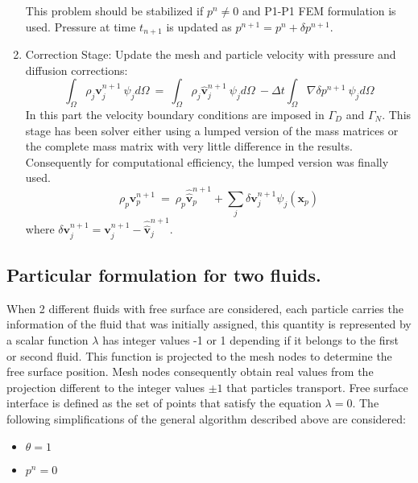 \begin{enumerate}
 This problem should be stabilized if $p^n\neq0$ and P1-P1 FEM formulation is used. Pressure at time $t_{n+1}$ is updated as $p^{n+1}=p^{n}+\delta p^{n+1}$.


 \item Correction Stage: Update the mesh and particle velocity with pressure and diffusion corrections:
 \begin{equation}\label{Step6a}
  \int_{\Omega} \rho_j \mathbf{v}_j^{n+1}\ \psi_j d\Omega \ = \ \int_{\Omega} \rho_j  \widehat{\mathbf{v}}_j^{n+1}\ \psi_j d\Omega\ - \Delta t \int_{\Omega}  \nabla \delta p^{n+1}\ \psi_j d\Omega
 \end{equation}
 In this part the velocity boundary conditions are imposed in $\Gamma_D$ and $\Gamma_N$. This stage has been solver either using a lumped version of the mass matrices or the complete mass matrix with very little difference in the results. Consequently for computational efficiency, the lumped version was finally used.
  \begin{equation}\label{Step6b}
  \rho_p \mathbf{v}_p^{n+1}\  = \ \rho_p \widehat{\widehat{\mathbf{v}}}_p^{n+1} + \sum_{j} \delta \mathbf{v}_j^{n+1} \psi_j(\mathbf{x}_{p})
  \end{equation}
  where $\delta \mathbf{v}_j^{n+1} = \mathbf{v}_j^{n+1}-\widehat{\widehat{\mathbf{v}}}_j^{n+1}$.

\end{enumerate} 

\subsection{Particular formulation for two fluids.}
When 2 different fluids with free surface are considered, each particle carries the information of the fluid that was initially assigned, this quantity is represented by a scalar function $\lambda$ has integer values -1 or 1 depending if it belongs to the first or second fluid. This function is projected to the mesh nodes to determine the free surface position. Mesh nodes consequently obtain real values from the projection different to the integer values $\pm1$ that particles transport. Free surface interface is defined as the set of points that satisfy the equation $\lambda=0$. The following simplifications of the general algorithm described above are considered:

\begin{itemize}
  \item $\theta=1$
  \item $p^n=0$
\end{itemize}

